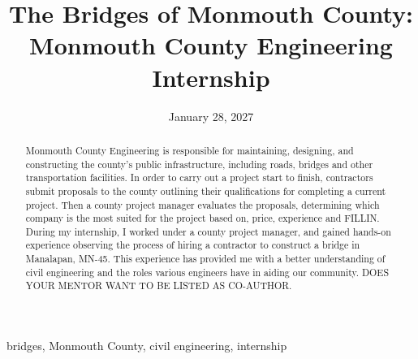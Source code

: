 \documentclass[12pt,conference,onecolumn]{IEEEtran}
\title{The Bridges of Monmouth County: Monmouth County Engineering Internship}
\author{%
\IEEEauthorblockN{Samantha Hein}\IEEEauthorblockA{Science \& Engineering\\Manalapan High School\\Englishtown, NJ\\\href{mailto:427shein@frhsd.com}{427shein@frhsd.com}}
}
\date{January 28, 2027}
\newcommand{\keywords}{bridges, Monmouth County, civil engineering, internship}
\begin{document}
\maketitle 

\begin{abstract}
Monmouth County Engineering is responsible for maintaining, designing, and constructing the county's public infrastructure, including roads, bridges and other transportation facilities. In order to carry out a project start to finish, contractors submit proposals to the county outlining their qualifications for completing a current project. Then a county project manager evaluates the proposals, determining which company is the most suited for the project based on, price, experience and FILLIN. During my internship, I worked under a county project manager, and gained hands-on experience observing the process of hiring a contractor to construct a bridge in Manalapan, MN-45. This experience has provided me with a better understanding of civil engineering and the roles various engineers have in aiding our community. DOES YOUR MENTOR WANT TO BE LISTED AS CO-AUTHOR.
\end{abstract}

\begin{IEEEkeywords}
\keywords
\end{IEEEkeywords}
\end{document}
